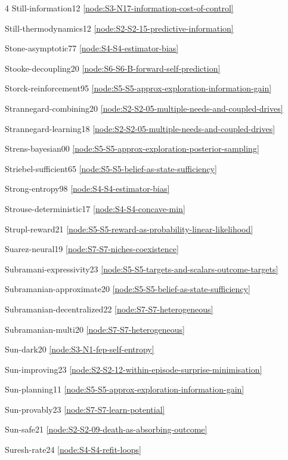 \documentclass[10pt]{article}
\begin{document}
{\begin{multicols}{4}
Still-information12 \hfill \ref{node:S3-N17-information-cost-of-control}\par
Still-thermodynamics12 \hfill \ref{node:S2-S2-15-predictive-information}\par
Stone-asymptotic77 \hfill \ref{node:S4-S4-estimator-bias}\par
Stooke-decoupling20 \hfill \ref{node:S6-S6-B-forward-self-prediction}\par
Storck-reinforcement95 \hfill \ref{node:S5-S5-approx-exploration-information-gain}\par
Strannegard-combining20 \hfill \ref{node:S2-S2-05-multiple-needs-and-coupled-drives}\par
Strannegard-learning18 \hfill \ref{node:S2-S2-05-multiple-needs-and-coupled-drives}\par
Strens-bayesian00 \hfill \ref{node:S5-S5-approx-exploration-posterior-sampling}\par
Striebel-sufficient65 \hfill \ref{node:S5-S5-belief-as-state-sufficiency}\par
Strong-entropy98 \hfill \ref{node:S4-S4-estimator-bias}\par
Strouse-deterministic17 \hfill \ref{node:S4-S4-concave-min}\par
Strupl-reward21 \hfill \ref{node:S5-S5-reward-as-probability-linear-likelihood}\par
Suarez-neural19 \hfill \ref{node:S7-S7-niches-coexistence}\par
Subramani-expressivity23 \hfill \ref{node:S5-S5-targets-and-scalars-outcome-targets}\par
Subramanian-approximate20 \hfill \ref{node:S5-S5-belief-as-state-sufficiency}\par
Subramanian-decentralized22 \hfill \ref{node:S7-S7-heterogeneous}\par
Subramanian-multi20 \hfill \ref{node:S7-S7-heterogeneous}\par
Sun-dark20 \hfill \ref{node:S3-N1-fep-self-entropy}\par
Sun-improving23 \hfill \ref{node:S2-S2-12-within-episode-surprise-minimisation}\par
Sun-planning11 \hfill \ref{node:S5-S5-approx-exploration-information-gain}\par
Sun-provably23 \hfill \ref{node:S7-S7-learn-potential}\par
Sun-safe21 \hfill \ref{node:S2-S2-09-death-as-absorbing-outcome}\par
Suresh-rate24 \hfill \ref{node:S4-S4-refit-loops}\par

\end{multicols}}
\end{document}
